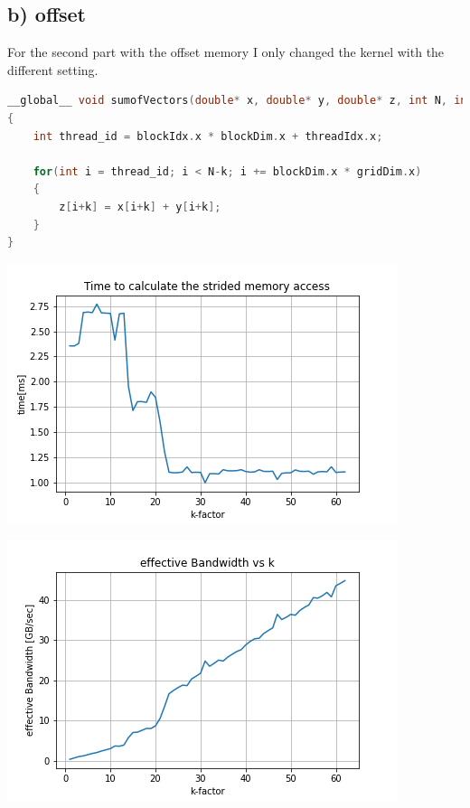 \documentclass[11pt,a4paper]{article}
\begin{document}
\subsection*{b) offset}
For the second part with the offset memory I only changed the kernel with the different setting.
\begin{lstlisting}[language=C++, caption={code for a)}]
__global__ void sumofVectors(double* x, double* y, double* z, int N, int k)
{
	int thread_id = blockIdx.x * blockDim.x + threadIdx.x;

	for(int i = thread_id; i < N-k; i += blockDim.x * gridDim.x)
	{
		z[i+k] = x[i+k] + y[i+k];
	}
}
\end{lstlisting}
\begin{minipage}[t]{0.49\textwidth}
	\includegraphics[width=\textwidth]{Bilder/Runtime_offset.png}
\end{minipage}
\begin{minipage}[t]{0.49\textwidth}
	\includegraphics[width=\textwidth]{Bilder/Bandwidth_offset.png}
\end{minipage}
\end{document}
